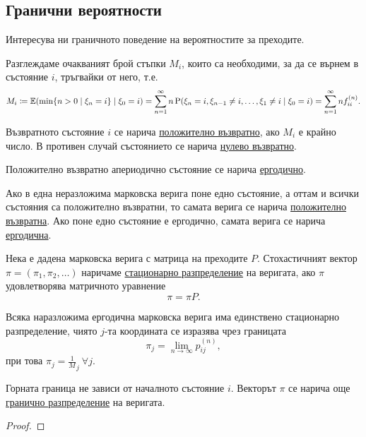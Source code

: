 \documentclass[numbers=endperiod, DIV=15, bibliography=totocnumbered]{scrartcl}
\begin{document}
\subsection{Гранични вероятности}

Интересува ни граничното поведение на вероятностите за преходите.

Разглеждаме очакваният брой стъпки $M_i$, които са необходими, за да се върнем в състояние $i$, тръгвайки от него, т.е.
\begin{multline*}
  M_i
  \coloneqq
  \mathbb{E}(\min \{ n > 0 \mid \xi_n = i \} \mid \xi_0 = i)
  =
  \sum_{n=1}^\infty n \operatorname{P}(\xi_n = i, \xi_{n-1} \neq i, \ldots, \xi_1 \neq i \mid \xi_0 = i)
  =
  \sum_{n=1}^\infty n f^{(n)}_{ii}.
\end{multline*}

\begin{definition}
  Възвратното състояние $i$ се нарича \uline{положително възвратно}, ако $M_i$ е крайно число. В противен случай състоянието се нарича \uline{нулево възвратно}.

  Положително възвратно апериодично състояние се нарича \uline{ергодично}.

  Ако в една неразложима марковска верига поне едно състояние, а оттам и всички състояния са положително възвратни, то самата верига се нарича \uline{положително възвратна}. Ако поне едно състояние е ергодично, самата верига се нарича \uline{ергодична}.
\end{definition}

\begin{definition}
  Нека е дадена марковска верига с матрица на преходите $P$. Стохастичният вектор $\pi = (\pi_1, \pi_2, \ldots)$ наричаме \uline{стационарно разпределение} на веригата, ако $\pi$ удовлетворява матричното уравнение
  \begin{displaymath}
    \pi = \pi P.
  \end{displaymath}
\end{definition}

\begin{theorem}
  Всяка наразложима ергодична марковска верига има единствено стационарно разпределение, чиято $j$-та координата се изразява чрез границата
  \begin{displaymath}
    \pi_j = \lim_{n \to \infty} p_{ij}^{(n)},
  \end{displaymath}
  при това $\pi_j = \frac 1 M_j~\forall j$.

  Горната граница не зависи от началното състояние $i$. Векторът $\pi$ се нарича още \uline{гранично разпределение} на веригата.
\end{theorem}
\begin{proof}
\end{proof}

\printbibliography
\end{document}
